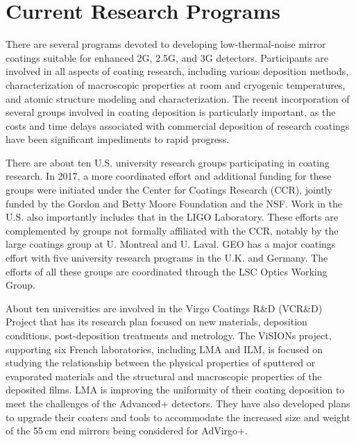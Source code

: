 \section{Current Research Programs}

There are several 
programs devoted to developing low-thermal-noise mirror coatings suitable for enhanced 2G, 2.5G, and 3G detectors. Participants are involved in all aspects of coating research, including various deposition methods, characterization of macroscopic properties at room and cryogenic temperatures, and atomic structure modeling and characterization. The recent incorporation 
of several groups involved in coating deposition is particularly important, as the costs and time delays associated with commercial deposition of research coatings have been significant impediments to rapid progress.

There are about ten U.S. university research groups participating in 
coating research. In 2017, a more coordinated effort and additional funding for these groups were initiated under the Center for Coatings Research (CCR), jointly funded by the Gordon and Betty Moore Foundation and the NSF. Work in the U.S. also importantly includes that in the LIGO Laboratory. These efforts are complemented by groups not formally affiliated with the CCR, notably by the large coatings group at U. Montreal and U. Laval. GEO has a major coatings effort with five university research programs in the U.K. and Germany. 
The efforts of all these groups are coordinated through 
the LSC Optics Working Group.

About ten universities are involved in the Virgo Coatings R\&D (VCR\&D) Project that has its research plan focused on new materials, deposition conditions, post-deposition treatments and metrology. The ViSIONs project, supporting six French laboratories, including LMA and ILM, is focused on studying the relationship between the physical properties of sputtered or evaporated materials and the structural and macroscopic properties of the deposited films. 
LMA is improving the uniformity of their coating deposition to meet the challenges of the Advanced+ detectors. They have also developed plans to upgrade their coaters and tools to accommodate the increased size and weight of the 55\,cm end mirrors being considered for AdVirgo+.

